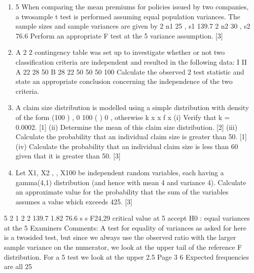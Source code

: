 \documentclass[a4paper,12pt]{article}
\begin{document}
\begin{enumerate}
\item

5 When comparing the mean premiums for policies issued by two companies, a twosample
t test is performed assuming equal population variances. The sample sizes and
sample variances are given by
2
n1 25 , s1 139.7
2
n2 30 , s2 76.6
Perform an appropriate F test at the 5%
variance assumption. [3]
\item A 2 2 contingency table was set up to investigate whether or not two classification
criteria are independent and resulted in the following data:
I II
A 22 28 50
B 28 22 50
50 50 100
Calculate the observed 2 test statistic and state an appropriate conclusion concerning
the independence of the two criteria. 
\item A claim size distribution is modelled using a simple distribution with density of the
form
(100 ) , 0 100
( )
0 , otherwise
k x x
f x
(i) Verify that k = 0.0002. [1]
(ii) Determine the mean of this claim size distribution. [2]
(iii) Calculate the probability that an individual claim size is greater than 50. [1]
(iv) Calculate the probability that an individual claim size is less than 60 given that
it is greater than 50. [3]
\item Let X1, X2 , , X100 be independent random variables, each having a gamma(4,1)
distribution (and hence with mean 4 and variance 4).
Calculate an approximate value for the probability that the sum of the variables
assumes a value which exceeds 425. [3]
\end{enumerate}
5
2
1
2
2
139.7
1.82
76.6
s
s
F24,29 critical value at 5%
accept H0 : equal variances at the 5%
Examiners Comments: A test for equality of variances as asked for here is a twosided
test, but since we always use the observed ratio with the larger sample variance
on the numerator, we look at the upper tail of the reference F distribution. For a 5%
test we look at the upper 2.5%
Page 3
6 Expected frequencies are all 25
\end{document}
